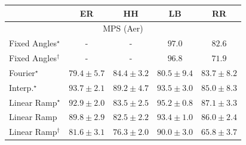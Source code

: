 \begin{tabular}{l|cccc|}
\toprule
            & ER & HH & LB & RR \\
\midrule
\multicolumn{5}{c}{\rule{0pt}{8pt}MPS (Aer)} \\
\midrule
Fixed Angles$^\star$ & {\cellcolor[HTML]{000000}} \color[HTML]{F1F1F1} {\cellcolor{white}} \color{black} - & {\cellcolor[HTML]{000000}} \color[HTML]{F1F1F1} {\cellcolor{white}} \color{black} - & {\cellcolor[HTML]{50014E}} \color[HTML]{F1F1F1} $97.0$ & {\cellcolor[HTML]{8B5CAA}} \color[HTML]{F1F1F1} $82.6$ \\
Fixed Angles$^\dagger$ & {\cellcolor[HTML]{000000}} \color[HTML]{F1F1F1} {\cellcolor{white}} \color{black} - & {\cellcolor[HTML]{000000}} \color[HTML]{F1F1F1} {\cellcolor{white}} \color{black} - & {\cellcolor[HTML]{520150}} \color[HTML]{F1F1F1} $96.8$ & {\cellcolor[HTML]{95AAD0}} \color[HTML]{F1F1F1} $71.9$ \\
Fourier$^\star$ & {\cellcolor[HTML]{8C74B5}} \color[HTML]{F1F1F1} $79.4\pm 5.7$ & {\cellcolor[HTML]{894DA3}} \color[HTML]{F1F1F1} $84.4\pm 3.2$ & {\cellcolor[HTML]{8C6AB1}} \color[HTML]{F1F1F1} $80.5\pm 9.4$ & {\cellcolor[HTML]{8A52A5}} \color[HTML]{F1F1F1} $83.7\pm 8.2$ \\
Interp.$^\star$ & {\cellcolor[HTML]{6F0A6B}} \color[HTML]{F1F1F1} $93.7\pm 2.1$ & {\cellcolor[HTML]{84258B}} \color[HTML]{F1F1F1} $89.2\pm 4.7$ & {\cellcolor[HTML]{710A6D}} \color[HTML]{F1F1F1} $93.5\pm 3.0$ & {\cellcolor[HTML]{8949A1}} \color[HTML]{F1F1F1} $85.0\pm 8.3$ \\
Linear Ramp$^\star$ & {\cellcolor[HTML]{760C71}} \color[HTML]{F1F1F1} $92.9\pm 2.0$ & {\cellcolor[HTML]{8A54A6}} \color[HTML]{F1F1F1} $83.5\pm 2.5$ & {\cellcolor[HTML]{61065D}} \color[HTML]{F1F1F1} $95.2\pm 0.8$ & {\cellcolor[HTML]{873897}} \color[HTML]{F1F1F1} $87.1\pm 3.3$ \\
Linear Ramp & {\cellcolor[HTML]{832088}} \color[HTML]{F1F1F1} $89.8\pm 2.9$ & {\cellcolor[HTML]{8B5CAA}} \color[HTML]{F1F1F1} $82.5\pm 2.2$ & {\cellcolor[HTML]{710A6D}} \color[HTML]{F1F1F1} $93.4\pm 1.0$ & {\cellcolor[HTML]{88419D}} \color[HTML]{F1F1F1} $86.0\pm 2.4$ \\
Linear Ramp$^\dagger$ & {\cellcolor[HTML]{8B62AD}} \color[HTML]{F1F1F1} $81.6\pm 3.1$ & {\cellcolor[HTML]{8C8BC0}} \color[HTML]{F1F1F1} $76.3\pm 2.0$ & {\cellcolor[HTML]{831F86}} \color[HTML]{F1F1F1} $90.0\pm 3.0$ & {\cellcolor[HTML]{B2CAE1}} \color[HTML]{000000} $65.8\pm 3.7$ \\

\end{tabular}

